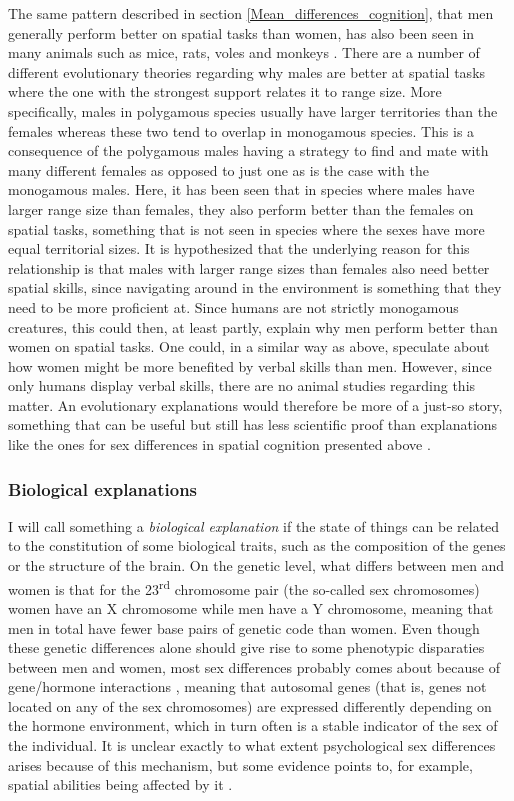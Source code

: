 The same pattern described in section \ref{Mean_differences_cognition}, that men generally perform better on spatial tasks than women, has also been seen in many animals such as mice, rats, voles and monkeys \parencite{Jacobs1990, Gaulin1992, Jones2003}. There are a number of different evolutionary theories regarding why males are better at spatial tasks where the one with the strongest support relates it to range size. More specifically, males in polygamous species usually have larger territories than the females whereas these two tend to overlap in monogamous species. This is a consequence of the polygamous males having a strategy to find and mate with many different females as opposed to just one as is the case with the monogamous males. Here, it has been seen that in species where males have larger range size than females, they also perform better than the females on spatial tasks, something that is not seen in species where the sexes have more equal territorial sizes. It is hypothesized that the underlying reason for this relationship is that males with larger range sizes than females also need better spatial skills, since navigating around in the environment is something that they need to be more proficient at. Since humans are not strictly monogamous creatures, this could then, at least partly, explain why men perform better than women on spatial tasks. One could, in a similar way as above, speculate about how women might be more benefited by verbal skills than men. However, since only humans display verbal skills, there are no animal studies regarding this matter. An evolutionary explanations would therefore be more of a just-so story, something that can be useful but still has less scientific proof than explanations like the ones for sex differences in spatial cognition presented above \parencite{Holcomb1996}.

\subsubsection{Biological explanations} \label{Biological_explanations}

I will call something a \emph{biological explanation} if the state of things can be related to the constitution of some biological traits, such as the composition of the genes or the structure of the brain. On the genetic level, what differs between men and women is that for the 23\textsuperscript{rd} chromosome pair (the so-called sex chromosomes) women have an X chromosome while men have a Y chromosome, meaning that men in total have fewer base pairs of genetic code than women. Even though these genetic differences alone should give rise to some phenotypic disparaties between men and women, most sex differences probably comes about because of gene/hormone interactions \parencite{Gaulin1992}, meaning that autosomal genes (that is, genes not located on any of the sex chromosomes) are expressed differently depending on the hormone environment, which in turn often is a stable indicator of the sex of the individual. It is unclear exactly to what extent psychological sex differences arises because of this mechanism, but some evidence points to, for example, spatial abilities being affected by it \parencite{Berenbaum2016}.

